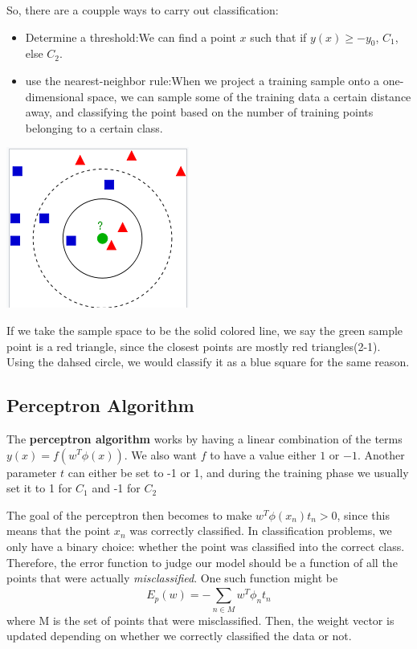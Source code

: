 \documentclass{tufte-handout}
\begin{document}
	So, there are a coupple ways to carry out classification:
	\begin{itemize}
			\item{Determine a threshold}:We can find a point $x$ such that if $y(x)\geq -y_{0}$,
					$C_{1}$, else $C_{2}$.
			\item{use the nearest-neighbor rule}:When we project a training sample onto a 
					one-dimensional space, we can sample some of the training data a certain 
					distance away, and classifying the point based on the number of training 
					points belonging to a certain class.
	\end{itemize}
	\begin{marginfigure}
			\includegraphics[width=\linewidth]{nearest_neighbors}
			\caption{If we take the sample space to be the solid colored line, we say the green
				sample point is a red triangle, since the closest points are mostly red triangles(2-1).
				Using the dahsed circle, we would classify it as a blue square for the same reason.}
	\end{marginfigure}
\subsection{Perceptron Algorithm}
	The \textbf{perceptron algorithm} works by having a linear combination of the terms 
	$y(x) = f(w^{T}\phi(x))$. We also want $f$ to have a value either $1$ or $-1$. Another
	parameter $t$ can either be set to -1 or 1, and during the training phase we usually set it
	to 1 for $C_{1}$ and -1 for $C_{2}$
	
	The goal of the perceptron then becomes to make $w^{T}\phi(x_{n})t_{n} > 0$, since this means
	that the point $x_{n}$ was correctly classified. In classification problems, we only have a binary
	choice: whether the point was classified into the correct class. Therefore, the error function to 
	judge our model should be a function of all the points that were actually \textit{misclassified}.
	One such function might be
	\[ E_{p}(w) = -\sum_{n\in M}^{}w^{T}\phi_{n}t_{n}\]
	where M is the set of points that were misclassified.
	Then, the weight vector is updated depending on whether we correctly classified the data or not. 
\end{document}
